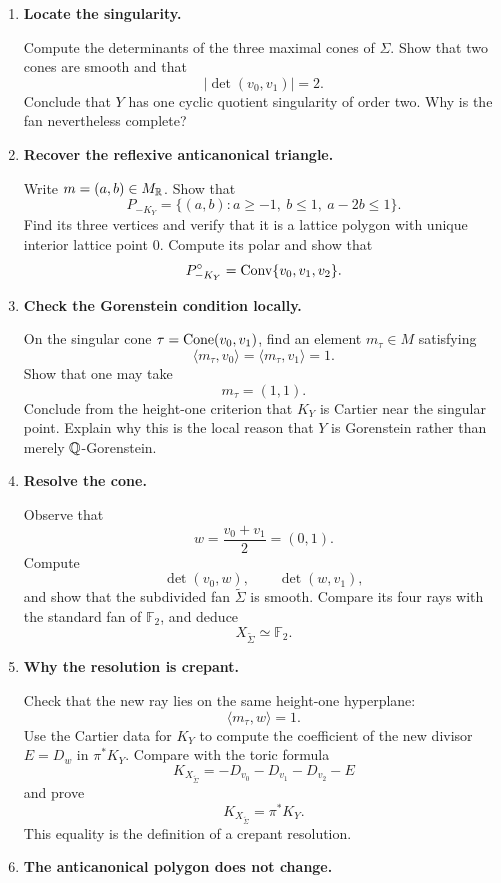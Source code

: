 \begin{enumerate}[label=\textbf{Hint \arabic*.},wide=0pt]

\item \textbf{Locate the singularity.}

Compute the determinants of the three maximal cones of \(\Sigma\).
Show that two cones are smooth and that
\[
|\det(v_0,v_1)|=2.
\]
Conclude that \(Y\) has one cyclic quotient singularity of order two.
Why is the fan nevertheless complete?

\item \textbf{Recover the reflexive anticanonical triangle.}

Write \(m=(a,b)\in M_{\mathbb{R}}\). Show that
\[
P_{-K_Y}
=
\{(a,b):a\geq-1,\ b\leq1,\ a-2b\leq1\}.
\]
Find its three vertices and verify that it is a lattice polygon with
unique interior lattice point \(0\). Compute its polar and show that
\[
P_{-K_Y}^\circ
=
\operatorname{Conv}\{v_0,v_1,v_2\}.
\]

\item \textbf{Check the Gorenstein condition locally.}

On the singular cone \(\tau=\operatorname{Cone}(v_0,v_1)\), find an element
\(m_\tau\in M\) satisfying
\[
\langle m_\tau,v_0\rangle
=
\langle m_\tau,v_1\rangle
=1.
\]
Show that one may take
\[
m_\tau=(1,1).
\]
Conclude from the height-one criterion that \(K_Y\) is Cartier near
the singular point. Explain why this is the local reason that
\(Y\) is Gorenstein rather than merely \(\mathbb{Q}\)-Gorenstein.

\item \textbf{Resolve the cone.}

Observe that
\[
w=\frac{v_0+v_1}{2}=(0,1).
\]
Compute
\[
\det(v_0,w),
\qquad
\det(w,v_1),
\]
and show that the subdivided fan \(\widetilde\Sigma\) is smooth.
Compare its four rays with the standard fan of \(\mathbb F_2\), and
deduce
\[
X_{\widetilde\Sigma}\simeq\mathbb F_2.
\]

\item \textbf{Why the resolution is crepant.}

Check that the new ray lies on the same height-one hyperplane:
\[
\langle m_\tau,w\rangle=1.
\]
Use the Cartier data for \(K_Y\) to compute the coefficient of the
new divisor \(E=D_w\) in \(\pi^*K_Y\). Compare with the toric formula
\[
K_{X_{\widetilde\Sigma}}
=-D_{v_0}-D_{v_1}-D_{v_2}-E
\]
and prove
\[
\boxed{K_{X_{\widetilde\Sigma}}=\pi^*K_Y.}
\]
This equality is the definition of a crepant resolution.

\item \textbf{The anticanonical polygon does not change.}


\end{enumerate}
